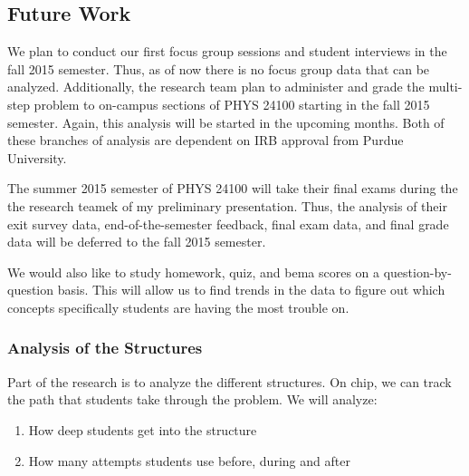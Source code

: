 \subsection{Future Work}

We plan to conduct our first focus group sessions and student interviews in the fall 2015 semester. Thus, as of now there is no focus group data that can be analyzed. Additionally, the research team plan to administer and grade the multi-step problem to on-campus sections of PHYS 24100 starting in the fall 2015 semester. Again, this analysis will be started in the upcoming months. Both of these branches of analysis are dependent on IRB approval from Purdue University.

The summer 2015 semester of PHYS 24100 will take their final exams during the the research teamek of my preliminary presentation. Thus, the analysis of their exit survey data, end-of-the-semester feedback, final exam data, and final grade data will be deferred to the fall 2015 semester.

We would also like to study homework, quiz, and \gls{bema} scores on a question-by-question basis. This will allow us to find trends in the data to figure out which concepts specifically students are having the most trouble on.


\subsubsection{Analysis of the Structures}

Part of the research is to analyze the different structures. On \gls{chip}, we can track the path that students take through the problem. We will analyze:

\begin{enumerate}
\item How deep students get into the structure
\item How many attempts students use before, during and after
\end{enumerate}